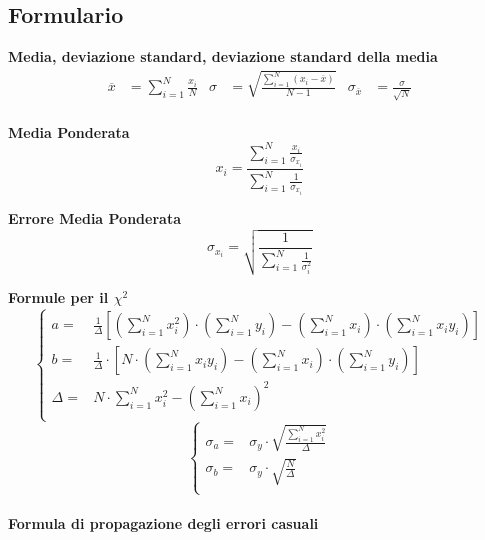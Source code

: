 \documentclass[a4paper,11pt,oneside]{article}
\begin{document}
\subsection{Formulario}
\textbf{Media, deviazione standard, deviazione standard della media}
\begin{align*}
        \overline{x}&=\sum\limits_{i=1}^{N} \frac{x_{i}}{N}&
        \sigma&=\sqrt{\frac{\sum\limits_{i=1}^{N} (x_{i}-\overline{x})}{N-1}}&
        \sigma_{\overline{x}}&=\frac{\sigma}{\sqrt{N}}
\end{align*}\\

\textbf{Media Ponderata}
\begin{equation*}
\label{eq:media_pond}
    x_i=\frac{\sum_{i=1}^{N}\frac{x_i}{\sigma_{x_i}}}{\sum_{i=1}^{N}\frac{1}{\sigma_{x_i}}}
\end{equation*}

\textbf{Errore Media Ponderata}
\begin{equation*}
\label{eq:errore_media_pond}
     \sigma_{x_i}=\sqrt{\frac{1}{\sum_{i=1}^{N}\frac{1}{\sigma_{i}^{2}}}}
\end{equation*}

\textbf{Formule per il ${\chi}^2$}
\begin{equation*}
        \begin{cases}
    a=&\frac{1}{\Delta}[(\sum\limits_{i=1}^{N}{x_{i}^{2}})\cdot(\sum\limits_{i=1}^{N}{y_{i}})-(\sum\limits_{i=1}^{N}{x_{i}})\cdot(\sum\limits_{i=1}^{N}{x_{i}y_{i}})] \\ 
    b=&\frac{1}{\Delta }\cdot \left [N\cdot \left ( \sum\limits_{i=1}^{N}x_i y_i \right )-\left ( \sum\limits_{i=1}^{N}x_i \right )\cdot \left ( \sum\limits_{i=1}^{N}y_i \right )  \right ]\\
    \Delta=& N\cdot \sum\limits_{i=1}^{N} x_i^{2} - \left ( \sum\limits_{i=1}^{N}x_i \right )^{2}\\
    \end{cases}
\end{equation*}
\begin{equation*}
    \begin{cases}
    \sigma_{a}=&\sigma_{y}\cdot\sqrt{\frac{\sum_{i=1}^{N}{x_{i}^{2}}}{\Delta}} \\
    \sigma_{b}=&\sigma_y\cdot \sqrt{\frac{N}{\Delta }}\\
    \end{cases}
    \label{equation:err_chi_quadro}
\end{equation*}
\\
\textbf{Formula di propagazione degli errori casuali}\\
\end{document}
